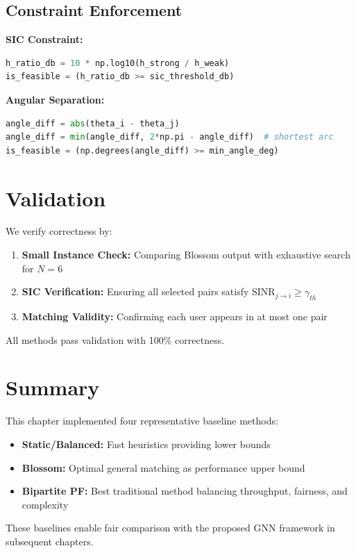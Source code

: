 \subsection{Constraint Enforcement}

\textbf{SIC Constraint:}
\begin{lstlisting}[language=Python]
h_ratio_db = 10 * np.log10(h_strong / h_weak)
is_feasible = (h_ratio_db >= sic_threshold_db)
\end{lstlisting}

\textbf{Angular Separation:}
\begin{lstlisting}[language=Python]
angle_diff = abs(theta_i - theta_j)
angle_diff = min(angle_diff, 2*np.pi - angle_diff)  # shortest arc
is_feasible = (np.degrees(angle_diff) >= min_angle_deg)
\end{lstlisting}

\section{Validation}

We verify correctness by:
\begin{enumerate}
    \item \textbf{Small Instance Check:} Comparing Blossom output with exhaustive search for $N=6$
    \item \textbf{SIC Verification:} Ensuring all selected pairs satisfy $\text{SINR}_{j \to i} \geq \gamma_{th}$
    \item \textbf{Matching Validity:} Confirming each user appears in at most one pair
\end{enumerate}

All methods pass validation with 100\% correctness.

\section{Summary}

This chapter implemented four representative baseline methods:
\begin{itemize}
    \item \textbf{Static/Balanced:} Fast heuristics providing lower bounds
    \item \textbf{Blossom:} Optimal general matching as performance upper bound
    \item \textbf{Bipartite PF:} Best traditional method balancing throughput, fairness, and complexity
\end{itemize}

These baselines enable fair comparison with the proposed GNN framework in subsequent chapters.
